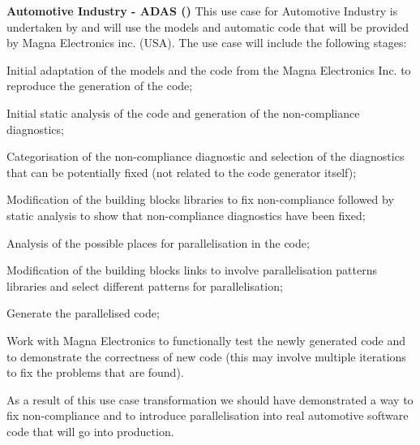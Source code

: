 \begin{Workpackage}{\thewpno}
\begin{Task}
\textbf{Automotive Industry - ADAS (\PRLshort{})}
This use case for Automotive Industry is undertaken by \PRshort and will use the models and automatic code that will be provided by Magna Electronics inc. (USA). The use case will include the following stages:
\begin{compactitem}
\item Initial adaptation of the models and the code from the Magna Electronics Inc. to reproduce the generation of the code;
\item Initial static analysis of the code and generation of the non-compliance diagnostics;
\item Categorisation of the non-compliance diagnostic and selection of the diagnostics that can be potentially fixed (not related to the code generator itself);
\item Modification of the building blocks libraries to fix non-compliance followed by static analysis to show that non-compliance diagnostics have been fixed;
\item Analysis of the possible places for parallelisation in the code;
\item Modification of the building blocks links to involve parallelisation patterns libraries and select different patterns for parallelisation;
\item Generate the parallelised code;
\item Work with Magna Electronics to functionally test the newly generated code and to demonstrate the correctness of new code (this may involve multiple iterations to fix the problems that are found).

\end{compactitem}
As a result of this use case transformation we should have demonstrated a way to fix non-compliance and to introduce parallelisation into real automotive software code that will
go into production.
\end{Task}

\begin{Task}

\TaskResults{
\ref{del:eval1}
\ref{del:eval2}
\ref{del:eval3}
}
\TaskHeader{}


\end{Task}
\end{Workpackage}
